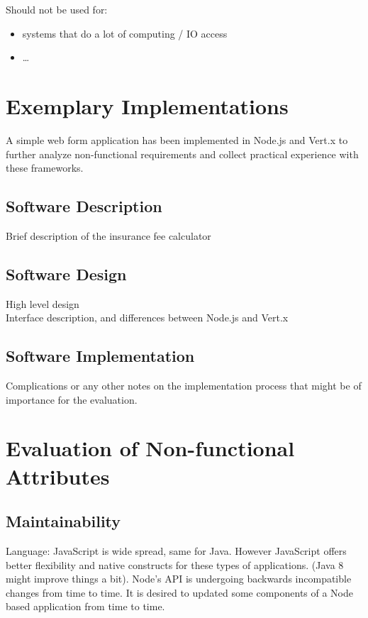Should not be used for:
\begin{itemize}
  \item systems that do a lot of computing / IO access
  \item \ldots
\end{itemize}
    
    
    



\section{Exemplary Implementations}
\label{exemplary_implementations}

A simple web form application has been implemented in Node.js and Vert.x to
further analyze non-functional requirements and collect practical experience
with these frameworks.

\subsection{Software Description}
\label{software_description}
Brief description of the insurance fee calculator

\subsection{Software Design}
\label{software_design}
High level design\\
Interface description, and differences between Node.js and Vert.x

\subsection{Software Implementation}
\label{software_implementation}
Complications or any other notes on the implementation process that might be of
importance for the evaluation.





\section{Evaluation of Non-functional Attributes}
\label{evaluation_nonfunctional}

\subsection{Maintainability}
\label{maintainability}
Language: JavaScript is wide spread, same for Java. However JavaScript offers
better flexibility and native constructs for these types of applications.
(Java 8 might improve things a bit).
Node's API is undergoing backwards incompatible changes from time to time.
It is desired to updated some components of a Node based application from
time to time.

